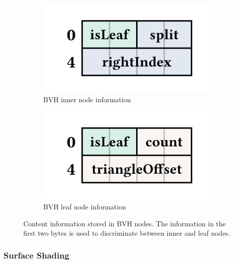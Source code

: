 \begin{figure}[H]
    \centering
    \begin{subfigure}[b]{0.45\textwidth}
        \includegraphics[width=\textwidth]{resources/bvh-node-info.png}
        \caption{\gls{BVH} inner node information}
        \label{fig:bvh-info-inner-node}
    \end{subfigure}
    \hfill
    \begin{subfigure}[b]{0.45\textwidth}
        \includegraphics[width=\textwidth]{resources/bvh-leaf-info.png}
        \caption{\gls{BVH} leaf node information}
        \label{fig:bvh-info-leaf-node}
    \end{subfigure}
    \caption{Content information stored in \gls{BVH} nodes. The information in the first two bytes is used to discriminate between inner and leaf nodes.}
    \label{fig:bvh-info}
\end{figure}

\subsubsection{Surface Shading}

